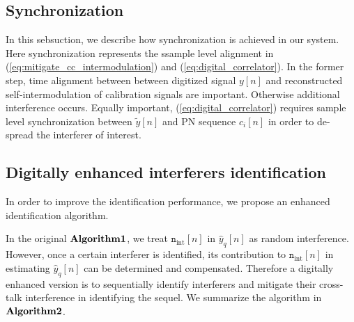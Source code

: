 \documentclass{IEEEtran}
\begin{document}
\subsection{Synchronization}
In this sebsuction, we describe how synchronization is achieved in our system. Here synchronization represents the ssample level alignment in (\ref{eq:mitigate_cc_intermodulation}) and (\ref{eq:digital_correlator}). In the former step, time alignment between between digitized signal $y[n]$ and reconstructed self-intermodulation of calibration signals are important. Otherwise additional interference occurs. Equally important, (\ref{eq:digital_correlator}) requires sample level synchronization between $\tilde{y}[n]$ and PN sequence $c_i[n]$ in order to de-spread the interferer of interest. 

%
%
\subsection{Digitally enhanced interferers identification}
\label{sec:enhanced_algorithm}
In order to improve the identification performance, we propose an enhanced identification algorithm.

In the original $\bf{Algorithm 1}$, we treat $\mathtt{n}_{\text{int}}[n]$ in $\hat{y}_q[n]$ as random interference. However, once a certain interferer is identified, its contribution to $\mathtt{n}_{\text{int}}[n]$ in estimating $\hat{y}_q[n]$ can be determined and compensated. Therefore a digitally enhanced version is to sequentially identify interferers and mitigate their cross-talk interference in identifying the sequel. We summarize the algorithm in $\bf{Algorithm 2}$.


\end{document}

